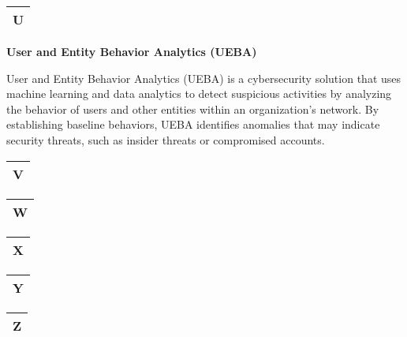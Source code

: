 \begin{table}
\justifying

\begin{tabular}{l}
\textbf{U} \\
\hline

\end{tabular}

\end{table}

\textbf{User and Entity Behavior Analytics (UEBA)}

User and Entity Behavior Analytics (UEBA) is a cybersecurity solution that uses machine learning and data analytics to detect suspicious activities by analyzing the behavior of users and other entities within an organization's network. By establishing baseline behaviors, UEBA identifies anomalies that may indicate security threats, such as insider threats or compromised accounts.

\begin{table}
\justifying

\begin{tabular}{l}
\textbf{V} \\
\hline

\end{tabular}

\end{table}

\begin{table}
\justifying

\begin{tabular}{l}
\textbf{W} \\
\hline

\end{tabular}

\end{table}

\begin{table}
\justifying

\begin{tabular}{l}
\textbf{X} \\
\hline

\end{tabular}

\end{table}

\begin{table}
\justifying

\begin{tabular}{l}
\textbf{Y} \\
\hline

\end{tabular}

\end{table}

\begin{table}
\justifying

\begin{tabular}{l}
\textbf{Z} \\
\hline

\end{tabular}

\end{table}

 